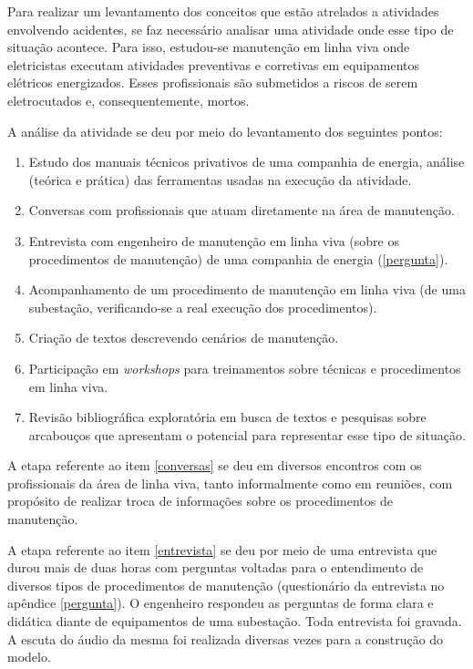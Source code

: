 Para realizar um levantamento dos conceitos que estão atrelados a atividades envolvendo acidentes, se faz necessário analisar uma atividade onde esse tipo de situação acontece. Para isso, estudou-se manutenção em linha viva onde eletricistas executam atividades preventivas e corretivas em equipamentos elétricos energizados. Esses profissionais são submetidos a riscos de serem eletrocutados e, consequentemente, mortos. 

A análise da atividade se deu por meio do levantamento dos seguintes pontos: 
\begin{enumerate}
	\item Estudo dos manuais técnicos privativos de uma companhia de energia, análise (teórica e prática) das ferramentas usadas na execução da atividade. \label{estudosprivativos}
	\item Conversas com profissionais que atuam diretamente na área de manutenção. \label{conversas}
	\item Entrevista com engenheiro de manutenção em linha viva (sobre os procedimentos de manutenção) de uma companhia de energia (\ref{pergunta}). \label{entrevista}
	\item Acompanhamento de um procedimento de manutenção em linha viva (de uma subestação, verificando-se a real execução dos procedimentos). \label{inloco}
	\item Criação de textos descrevendo cenários de manutenção.
	\item Participação em \textit{workshops} para treinamentos sobre técnicas e procedimentos em linha viva.
	\item Revisão bibliográfica exploratória em busca de textos e pesquisas sobre arcabouços que apresentam o potencial para representar esse tipo de situação. \label{revisaoexploratoria}
\end{enumerate}

A etapa referente ao item \ref{conversas} se deu em diversos encontros com os profissionais da área de linha viva, tanto informalmente como em reuniões, com propósito de realizar troca de informações sobre os procedimentos de manutenção. 

A etapa referente ao item \ref{entrevista} se deu por meio de uma entrevista que durou mais de duas horas com perguntas voltadas para o entendimento de diversos tipos de procedimentos de manutenção (questionário da entrevista no apêndice \ref{pergunta}). O engenheiro respondeu as perguntas de forma clara e didática diante de equipamentos de uma subestação. Toda entrevista foi gravada. A escuta do áudio da mesma foi realizada diversas vezes para a construção do modelo.  

